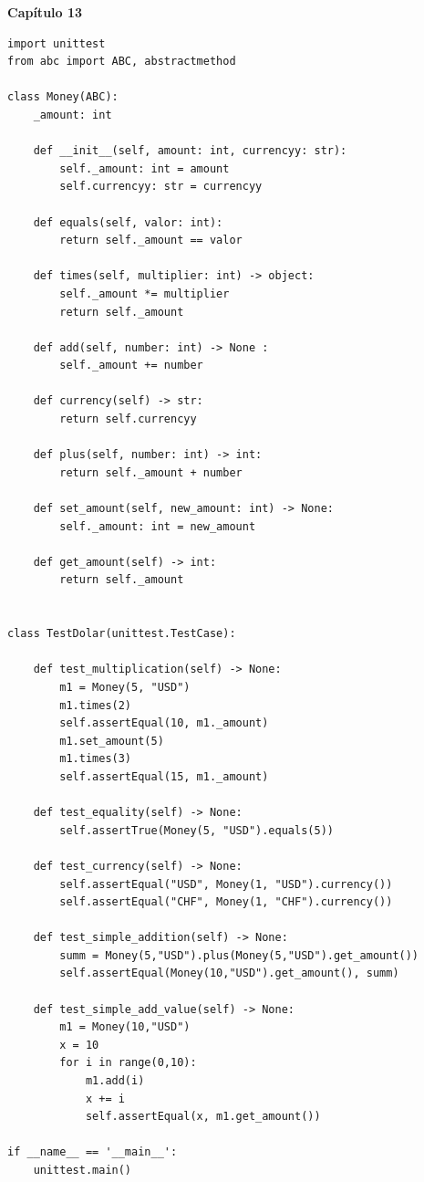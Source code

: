 \documentclass[a4paper,12pt]{article}
\newcommand{\capitulo}[1]{
    \vspace{1em}
    \noindent
    \colorbox{black!15}{
        \parbox{\dimexpr\linewidth-2\fboxsep}{
            \centering \Large \textbf{#1}
        }
    }
    \vspace{1em}
}
\begin{document}
\capitulo{Capítulo 13}
\begin{lstlisting}[style=pythonstyle]
import unittest
from abc import ABC, abstractmethod

class Money(ABC):
    _amount: int

    def __init__(self, amount: int, currencyy: str):
        self._amount: int = amount
        self.currencyy: str = currencyy 

    def equals(self, valor: int):
        return self._amount == valor 

    def times(self, multiplier: int) -> object:
        self._amount *= multiplier
        return self._amount

    def add(self, number: int) -> None :
        self._amount += number 

    def currency(self) -> str:
        return self.currencyy

    def plus(self, number: int) -> int:
        return self._amount + number 

    def set_amount(self, new_amount: int) -> None:
        self._amount: int = new_amount

    def get_amount(self) -> int:
        return self._amount


class TestDolar(unittest.TestCase):

    def test_multiplication(self) -> None:
        m1 = Money(5, "USD")
        m1.times(2) 
        self.assertEqual(10, m1._amount)
        m1.set_amount(5)
        m1.times(3) 
        self.assertEqual(15, m1._amount)

    def test_equality(self) -> None:
        self.assertTrue(Money(5, "USD").equals(5))

    def test_currency(self) -> None:
        self.assertEqual("USD", Money(1, "USD").currency())
        self.assertEqual("CHF", Money(1, "CHF").currency())

    def test_simple_addition(self) -> None:
        summ = Money(5,"USD").plus(Money(5,"USD").get_amount())
        self.assertEqual(Money(10,"USD").get_amount(), summ)

    def test_simple_add_value(self) -> None:
        m1 = Money(10,"USD")
        x = 10
        for i in range(0,10):
            m1.add(i)
            x += i
            self.assertEqual(x, m1.get_amount())

if __name__ == '__main__':
    unittest.main()
\end{lstlisting}
\end{document}
